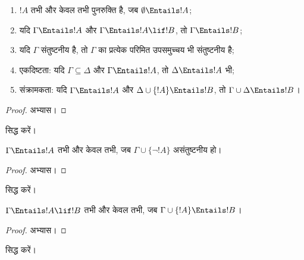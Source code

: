 \documentclass[../../../include/open-logic-section]{subfiles}
\begin{document}
\begin{prop}
\begin{enumerate} 
\item $!A$ तभी और केवल तभी पुनरुक्ति है, जब
  $\emptyset \Entails !A$; 
\item यदि $\Gamma \Entails !A$ और $\Gamma \Entails !A \lif !B$, तो
  $\Gamma \Entails !B$;
\item यदि $\Gamma$ संतुष्टनीय है, तो $\Gamma$ का प्रत्येक परिमित उपसमुच्चय
  भी संतुष्टनीय है; 
\item {} एकदिष्टता: यदि $\Gamma \subseteq \Delta$
  और $\Gamma \Entails !A$, तो $\Delta \Entails !A$ भी;
\item {} संक्रामकता: यदि $\Gamma \Entails !A$ और
  $\Delta \cup \{ !A\} \Entails !B$, तो $\Gamma \cup \Delta \Entails
  !B$।
\end{enumerate}
\end{prop}

\begin{proof}
अभ्यास।
\end{proof}

\begin{prob}
 सिद्ध करें।
\end{prob}

\begin{prop}
  $\Gamma \Entails !A$ तभी और केवल तभी, जब $\Gamma \cup \{\lnot !A\}$
  असंतुष्टनीय हो।
\end{prop}

\begin{proof}
अभ्यास।
\end{proof}

\begin{prob}
 सिद्ध करें।
\end{prob}

\begin{thm}[अर्थवैज्ञानिक निगमन प्रमेय]
   $\Gamma \Entails !A \lif !B$ तभी और केवल
  तभी, जब $\Gamma \cup \{!A\} \Entails !B$।
\end{thm}

\begin{proof}
अभ्यास।
\end{proof}

\begin{prob}
 सिद्ध करें।
\end{prob}
\end{document}
